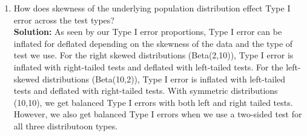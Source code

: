 \documentclass{article}\usepackage[]{graphicx}\usepackage[]{xcolor}
\begin{document}
\begin{enumerate}
\begin{enumerate}
    \item How does skewness of the underlying population distribution effect
    Type I error across the test types? \\
    \textbf{Solution:} As seen by our Type I error proportions, Type I error can be inflated for deflated depending on the skewness of the data and the type of test we use. For the right skewed distributions (Beta(2,10)), Type I error is inflated with right-tailed tests and deflated with left-tailed tests. For the left-skewed distributions (Beta(10,2)), Type I error is inflated with left-tailed tests and deflated with right-tailed tests. With symmetric distributions (10,10), we get balanced Type I errors with both left and right tailed tests. However, we also get balanced Type I errors when we use a two-sided test for all three distributoon types.
  \end{enumerate}
\end{enumerate}

\end{document}
